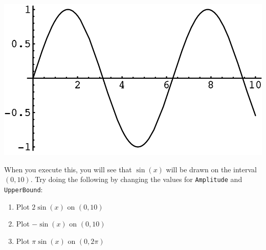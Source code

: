 \includegraphics{figures/Preliminaries/SineWithAmplitudeAndUpperBound}

When you execute this, you will see that $\sin(x)$ will be drawn on the interval $(0,10)$. Try doing the following by changing the values for \texttt{Amplitude} and \texttt{UpperBound}:

\begin{enumerate}
	   \item Plot $2\sin(x)$ on $(0,10)$
	   \item Plot $-\sin(x)$ on $(0,10)$
	   \item Plot $\pi\sin(x)$ on $(0, 2 \pi)$
\end{enumerate}

